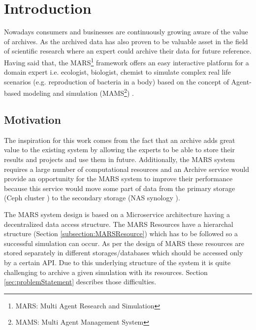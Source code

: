 \newpage
    \chapter{Introduction}
    Nowadays consumers and businesses are continuously growing aware of the value of archives. As the archived data has also proven
    to be valuable asset in the field of scientific research where an expert could archive their data for future reference. Having said that, the 
    MARS\footnote{MARS: Multi Agent Research and Simulation} framework offers an easy interactive platform for a domain expert i.e. ecologist, biologist, 
    chemist to simulate complex real life scenarios (e.g. reproduction of bacteria in a body) based on the concept of Agent-based modeling and simulation 
    (MAMS\footnote{MAMS: Multi Agent Management System}) \cite{agentModeling}.

        \section{Motivation}
        The inspiration for this work comes from the fact that an archive adds great value to the existing system by allowing the experts to be
        able to store their results and projects and use them in future. Additionally, the MARS system requires a large number of computational resources and
        an Archive service would provide an opportunity for the MARS system to improve their
        performance because this service would move some part of data from the primary storage (Ceph cluster \cite{Ceph}) to the secondary storage (NAS synology \cite{Synology}). 

        The MARS system design is based on a Microservice architecture \cite{MicroserviceNewMan} having a decentralized data \cite{atomic} access structure. 
        The MARS Resources have a hierarchal
        structure (Section \ref{subsection:MARSResource}) which has to be followed so a successful simulation can occur. As per the design of MARS these resources
        are stored separately in different storages/databases which should be accessed only by a certain API. Due to this underlying structure of the system it is quite 
        challenging to archive a given simulation with its resources. Section
        \ref{sec:problemStatement} describes those difficulties.  

